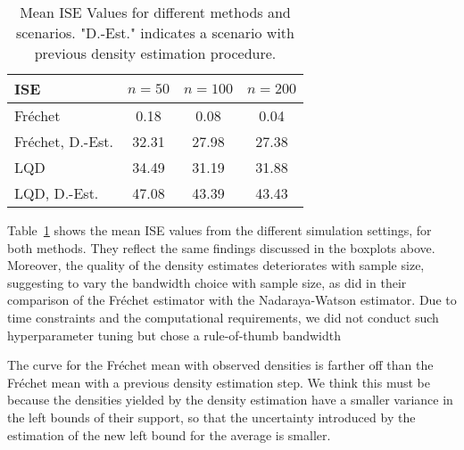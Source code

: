 \begin{table}[h!]
    \centering
    \begin{tabular}{lccc}
        \hline
        ISE & $n = 50$ & $n = 100$ & $n = 200$ \\
        \hline
        Fréchet             & 0.18 & 0.08 & 0.04 \\
        Fréchet, D.-Est.    & 32.31 & 27.98 & 27.38 \\
        LQD                 & 34.49 & 31.19 & 31.88 \\
        LQD, D.-Est.        & 47.08 & 43.39 & 43.43 \\
        \hline
    \end{tabular}
    \caption{Mean ISE Values for different methods and scenarios. "D.-Est." indicates
    a scenario with previous density estimation procedure.}
    \label{tab:mean_ise_values}
\end{table}
Table~\ref{tab:mean_ise_values} shows the mean ISE values from the different simulation
settings, for both methods. They reflect the same findings discussed in the boxplots
above.
Moreover, the quality of the density estimates deteriorates with sample size, suggesting
to vary the bandwidth choice with sample size, as \textcite{PetersenMüller2019} did in
their comparison of the Fréchet estimator with the Nadaraya-Watson estimator. Due to
time constraints and the computational requirements, we did not conduct such
hyperparameter tuning but chose a rule-of-thumb bandwidth
\parencites[Chapter~3.4.1]{Silverman1986}[Chapter~2.2.1]{LiRacine2007}

The curve for the Fréchet mean with observed densities is farther off than the Fréchet
mean with a previous density estimation step. We think this must be because the densities
yielded by the density estimation have a smaller variance in the left bounds of their
support, so that the uncertainty introduced by the estimation of the new left bound for
the average is smaller.